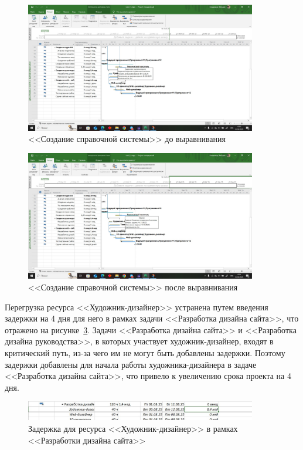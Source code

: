 \begin{figure}[H]
	\centering
	\includegraphics[width=0.9\textwidth]{img/task1/screen6.jpg}
	\caption{<<Создание справочной системы>> до выравнивания}
	\label{fig:screen6}
\end{figure}

\begin{figure}[H]
	\centering
	\includegraphics[width=0.9\textwidth]{img/task1/screen7.jpg}
	\caption{<<Создание справочной системы>> после выравнивания}
	\label{fig:screen7}
\end{figure}

Перегрузка ресурса <<Художник-дизайнер>> устранена путем введения задержки на 4 дня для него в рамках задачи <<Разработка дизайна сайта>>, что отражено на рисунке~\ref{fig:screen8}.
Задачи <<Разработка дизайна сайта>> и <<Разработка дизайна руководства>>, в которых участвует художник-дизайнер, входят в критический путь, из-за чего им не могут быть добавлены задержки.
Поэтому задержки добавлены для начала работы художника-дизайнера в задаче <<Разработка дизайна сайта>>, что привело к увеличению срока проекта на 4 дня.

\begin{figure}[H]
	\centering
	\includegraphics[width=0.9\textwidth]{img/task1/screen8.jpg}
	\caption{Задержка для ресурса <<Художник-дизайнер>> в рамках <<Разработки дизайна сайта>>}
	\label{fig:screen8}
\end{figure}

